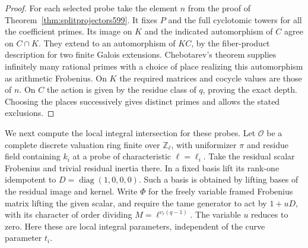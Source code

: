 \documentclass[a4paper,11pt]{article}
\theoremstyle{definition}
\theoremstyle{remark}
\newcommand{\ZZ}{\mathbb Z}\newcommand{\ord}{\operatorname{ord}}
\numberwithin{equation}{section}
\begin{document}
\begin{proof}
For each selected probe take the element \(n\) from the proof
of Theorem~\ref{thm:splitprojectors599}. It fixes \(P\) and the
full cyclotomic towers for all the coefficient primes. Its image
on \(K\) and the indicated automorphism of \(C\) agree on
\(C\cap K\). They extend to an automorphism of \(KC\), by the
fiber-product description for two finite Galois extensions.
Chebotarev's theorem supplies infinitely many rational primes
with a choice of place realizing this automorphism as arithmetic
Frobenius. On \(K\) the required matrices and cocycle values
are those of \(n\). On \(C\) the action is given by the
residue class of \(q\), proving the exact depth. Choosing the
places successively gives distinct primes and allows the stated
exclusions.
\end{proof}

We next compute the local integral intersection for these probes.
Let \(\mathcal O\) be a complete discrete valuation ring finite
over \(\ZZ_\ell\), with uniformizer \(\pi\) and residue field
containing \(k_i\) at a probe of characteristic \(\ell=\ell_i\).
Take the residual scalar Frobenius and trivial residual inertia
there. In a fixed basis lift its rank-one idempotent to
\(D=\operatorname{diag}(1,0,0,0)\). Such a basis is obtained
by lifting bases of the residual image and kernel. Write
\(\Phi\) for the freely variable framed Frobenius matrix lifting the
given scalar, and require the tame generator to act by
\(1+uD\), with its character of order dividing
\(M=\ell^{v_\ell(q-1)}\). The variable \(u\) reduces to zero.
Here these are local integral parameters, independent of the
curve parameter \(t_i\).
\end{document}
